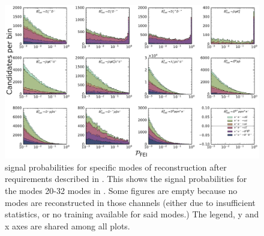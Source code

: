 \begin{figure}[htbp!]

    \includegraphics[width=1\textwidth]{figures/appendices/FEI_signal_probabilities/Bz_feiSigProbs2.pdf}

    \caption{\label{fig:feisigprobs4} \FEI signal probabilities for specific modes of \Bz reconstruction after requirements described in .
    This shows the signal probabilities for the modes 20-32 \Bz modes in .
    Some figures are empty because no modes are reconstructed in those channels (either due to insufficient statistics, or no training available for said modes.)
    The legend, y and x axes are shared among all plots.
    }
\end{figure}